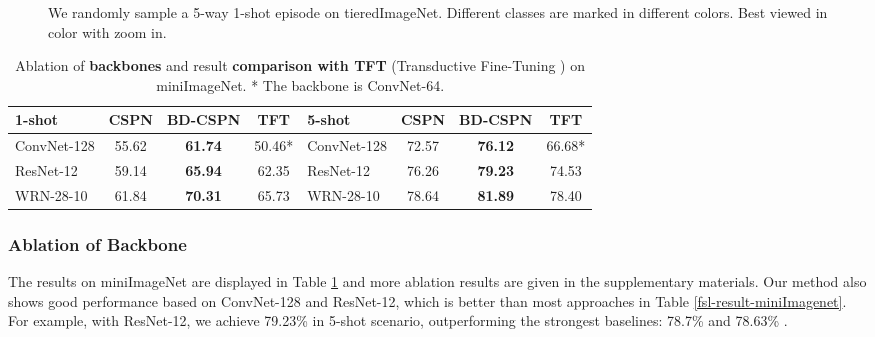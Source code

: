 \documentclass[runningheads]{llncs}
\begin{document}
\begin{figure}
\centering
{}\centering
\caption{We randomly sample a 5-way 1-shot episode on tieredImageNet. Different classes are marked in different colors. Best viewed in color with zoom in.}
\end{figure}
\begin{table}
\small
\centering
\caption{Ablation of \textbf{backbones} and result \textbf{comparison with TFT} (Transductive Fine-Tuning \cite{dhillon2020a}) on miniImageNet. * The backbone is ConvNet-64.}
\begin{tabular}{lccc|lccc}
\hline
1-shot & CSPN & BD-CSPN & TFT & 5-shot & CSPN & BD-CSPN & TFT \\ \hline
 ConvNet-128 & 55.62 & \textbf{61.74} & 50.46* &  ConvNet-128 &  72.57 & \textbf{76.12} & 66.68* \\ 
 ResNet-12 &  59.14 & \textbf{65.94} & 62.35 &  ResNet-12  & 76.26 & \textbf{79.23} & 74.53  \\ 
 WRN-28-10 &  61.84 & \textbf{70.31} & 65.73  & WRN-28-10  & 78.64 & \textbf{81.89}  & 78.40 \\ \hline
\end{tabular}
\label{comparison-pn-cspn}
\end{table}

\subsubsection{Ablation of Backbone}
The results on miniImageNet are displayed in Table \ref{comparison-pn-cspn} and more ablation results are given in the supplementary materials. Our method also shows good performance based on ConvNet-128 and ResNet-12, which is better than most approaches in Table \ref{fsl-result-miniImagenet}. For example, with ResNet-12, we achieve 79.23\% in 5-shot scenario, outperforming the strongest baselines: 78.7\% \cite{li2019learning} and 78.63\% \cite{lee2019meta}. 
\end{document}
